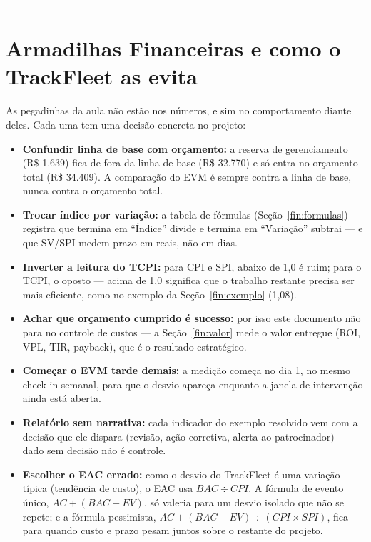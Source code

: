 \documentclass[11pt,a4paper]{article}
\newcommand{\separador}{\par\vspace{2mm}\hrule\vspace{4mm}}
\begin{document}
\separador

\section{Armadilhas Financeiras e como o TrackFleet as evita}\label{fin:armadilhas}

\noindent As pegadinhas da aula não estão nos números, e sim no comportamento diante deles. Cada uma tem uma decisão concreta no projeto:

\begin{itemize}[itemsep=5pt]
  \item \textbf{Confundir linha de base com orçamento:} a reserva de gerenciamento (R\$ 1.639) fica de fora da linha de base (R\$ 32.770) e só entra no orçamento total (R\$ 34.409). A comparação do EVM é sempre contra a linha de base, nunca contra o orçamento total.
  \item \textbf{Trocar índice por variação:} a tabela de fórmulas (Seção~\ref{fin:formulas}) registra que termina em ``Índice'' divide e termina em ``Variação'' subtrai --- e que SV/SPI medem prazo em reais, não em dias.
  \item \textbf{Inverter a leitura do TCPI:} para CPI e SPI, abaixo de 1,0 é ruim; para o TCPI, o oposto --- acima de 1,0 significa que o trabalho restante precisa ser mais eficiente, como no exemplo da Seção~\ref{fin:exemplo} (1,08).
  \item \textbf{Achar que orçamento cumprido é sucesso:} por isso este documento não para no controle de custos --- a Seção~\ref{fin:valor} mede o valor entregue (ROI, VPL, TIR, payback), que é o resultado estratégico.
  \item \textbf{Começar o EVM tarde demais:} a medição começa no dia 1, no mesmo check-in semanal, para que o desvio apareça enquanto a janela de intervenção ainda está aberta.
  \item \textbf{Relatório sem narrativa:} cada indicador do exemplo resolvido vem com a decisão que ele dispara (revisão, ação corretiva, alerta ao patrocinador) --- dado sem decisão não é controle.
  \item \textbf{Escolher o EAC errado:} como o desvio do TrackFleet é uma variação típica (tendência de custo), o EAC usa $BAC \div CPI$. A fórmula de evento único, $AC + (BAC - EV)$, só valeria para um desvio isolado que não se repete; e a fórmula pessimista, $AC + (BAC - EV) \div (CPI \times SPI)$, fica para quando custo e prazo pesam juntos sobre o restante do projeto.
\end{itemize}
\end{document}
